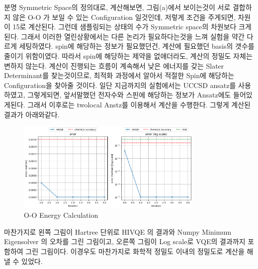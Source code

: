 \documentclass[11pt]{article}
\begin{document}
분명 Symmetric Space의 정의대로, 계산해보면, 그림(a)에서 보이는것이 서로 결합하지 않은 O-O 가 보일 수 있는 Configuration 일것인데, 저렇게 조건을 주게되면, 차원이 15로 계산된다. 
그런데 샘플링되는 상태의 수가 Symmetric space의 차원보다 크게된다. 그래서 이러한 열린상황에서는 다른 논리가 필요하다는것을 느껴 실험을 약간 다르게 세팅하였다. 
spin에 해당하는 정보가 필요했던건, 계산에 필요했던 basis의 갯수를 줄이기 위함이였다. 따라서 spin에 해당하는 제약을 없애더라도, 계산의 정밀도 자체는 변하지 않는다. 
계산이 진행되는 흐름이 계속해서 낮은 에너지를 갖는 Slater Determinant를 찾는것이므로, 최적화 과정에서 알아서 적절한 Spin에 해당하는 Configuration을 찾아줄 것이다. 
일단 지금까지의 실험에서는 UCCSD ansatz를 사용하였고, 그렇게되면, 앞서말했던 전자수와 스핀에 해당하는 정보가 Ansatz에도 들어있게된다. 그래서 이후로는 twolocal Anstz를 이용해서 계산을 수행한다. 
그렇게 계산된 결과가 아래와같다. 

\begin{figure}[H]
  \centering
  \includegraphics[width=0.8\textwidth]{fig/OO_EE.png}
  \caption{O-O Energy Calculation}
  \label{fig:first}
\end{figure}
마찬가지로 왼쪽 그림이 Hartree 단위로 HIVQE 의 결과와 Numpy Minimum Eigensolver 의 오차를 그린 그림이고, 오른쪽 그림이 Log scale로 VQE의 결과까지 포함하여 그린 그림이다. 
이경우도 마찬가지로 화학적 정밀도 이내의 정밀도로 계산을 해낼 수 있었다. 
\end{document}
